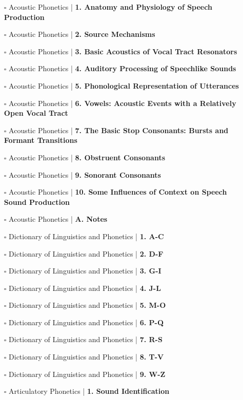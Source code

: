 \documentclass[a4, landscape, 12pt]{article}
\newcommand{\checkbox}{$\square$}%
\begin{document}
\begin{itemize}
{}
\item [\checkbox]  Acoustic Phonetics | \textbf{ 1. Anatomy and Physiology of Speech Production
}
\item [\checkbox]  Acoustic Phonetics | \textbf{ 2. Source Mechanisms
}
\item [\checkbox]  Acoustic Phonetics | \textbf{ 3. Basic Acoustics of Vocal Tract Resonators
}
\item [\checkbox]  Acoustic Phonetics | \textbf{ 4. Auditory Processing of Speechlike Sounds
}
\item [\checkbox]  Acoustic Phonetics | \textbf{ 5. Phonological Representation of Utterances
}
\item [\checkbox]  Acoustic Phonetics | \textbf{ 6. Vowels: Acoustic Events with a Relatively Open Vocal Tract
}
\item [\checkbox]  Acoustic Phonetics | \textbf{ 7. The Basic Stop Consonants: Bursts and Formant Transitions
}
\item [\checkbox]  Acoustic Phonetics | \textbf{ 8. Obstruent Consonants
}
\item [\checkbox]  Acoustic Phonetics | \textbf{ 9. Sonorant Consonants
}
\item [\checkbox]  Acoustic Phonetics | \textbf{ 10. Some Influences of Context on Speech Sound Production
}
\item [\checkbox]  Acoustic Phonetics | \textbf{ A. Notes
}
\item [\checkbox]  Dictionary of Linguistics and Phonetics | \textbf{ 1. A-C
}
\item [\checkbox]  Dictionary of Linguistics and Phonetics | \textbf{ 2. D-F
}
\item [\checkbox]  Dictionary of Linguistics and Phonetics | \textbf{ 3. G-I
}
\item [\checkbox]  Dictionary of Linguistics and Phonetics | \textbf{ 4. J-L
}
\item [\checkbox]  Dictionary of Linguistics and Phonetics | \textbf{ 5. M-O
}
\item [\checkbox]  Dictionary of Linguistics and Phonetics | \textbf{ 6. P-Q
}
\item [\checkbox]  Dictionary of Linguistics and Phonetics | \textbf{ 7. R-S
}
\item [\checkbox]  Dictionary of Linguistics and Phonetics | \textbf{ 8. T-V
}
\item [\checkbox]  Dictionary of Linguistics and Phonetics | \textbf{ 9. W-Z
}
\item [\checkbox]  Articulatory Phonetics | \textbf{ 1. Sound Identification
}
\end{itemize}
\end{document}
